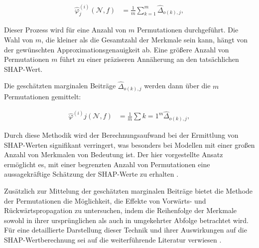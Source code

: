 \begin{align}
    \label{eq:permu-shap-eq}
    \hat{\varphi}^{(i)}_{j} (\mathcal{N}, f) &= \frac{1}{m}\sum_{k=1}^{m}\hat{\Delta}_{o(k), j},
\end{align}

Dieser Prozess wird für eine Anzahl von $m$ Permutationen durchgeführt. Die Wahl von $m$,
die kleiner als die Gesamtzahl der Merkmale sein kann, hängt von der gewünschten Approximationsgenauigkeit
ab. Eine größere Anzahl von Permutationen $m$ führt zu einer präziseren Annäherung an den tatsächlichen SHAP-Wert.

Die geschätzten marginalen Beiträge $\hat{\Delta}_{o(k), j}$ werden dann über die $m$ Permutationen gemittelt:

\begin{align}
\hat{\varphi}^{(i)}{j} (\mathcal{N}, f) &= \frac{1}{m}\sum{k=1}^{m}\hat{\Delta}_{o(k), j},
\end{align}

Durch diese Methodik wird der Berechnungsaufwand bei der Ermittlung von SHAP-Werten 
signifikant verringert, was besonders bei Modellen mit einer großen Anzahl von Merkmalen von 
Bedeutung ist. Der hier vorgestellte Ansatz ermöglicht es, mit einer begrenzten Anzahl von 
Permutationen eine aussagekräftige Schätzung der SHAP-Werte zu erhalten \cite[S. 39]{Molnar_2023}.

Zusätzlich zur Mittelung der geschätzten marginalen Beiträge bietet die Methode der Permutationen 
die Möglichkeit, die Effekte von Vorwärts- und Rückwärtspropagation zu untersuchen, 
indem die Reihenfolge der Merkmale sowohl in ihrer ursprünglichen als auch in umgekehrter 
Abfolge betrachtet wird. Für eine detaillierte Darstellung dieser Technik und ihrer 
Auswirkungen auf die SHAP-Wertberechnung sei auf die weiterführende Literatur verwiesen \cite[S. 39f]{Molnar_2023}.


